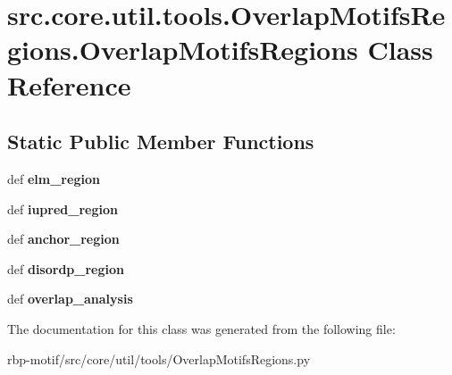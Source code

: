 \hypertarget{classsrc_1_1core_1_1util_1_1tools_1_1OverlapMotifsRegions_1_1OverlapMotifsRegions}{\section{src.\-core.\-util.\-tools.\-Overlap\-Motifs\-Regions.\-Overlap\-Motifs\-Regions Class Reference}
\label{classsrc_1_1core_1_1util_1_1tools_1_1OverlapMotifsRegions_1_1OverlapMotifsRegions}
}
\subsection*{Static Public Member Functions}
\begin{DoxyCompactItemize}
\item 
\hypertarget{classsrc_1_1core_1_1util_1_1tools_1_1OverlapMotifsRegions_1_1OverlapMotifsRegions_a29a40ac0aa4ac1c90a13525207171a10}{def {\bfseries elm\-\_\-region}}\label{classsrc_1_1core_1_1util_1_1tools_1_1OverlapMotifsRegions_1_1OverlapMotifsRegions_a29a40ac0aa4ac1c90a13525207171a10}

\item 
\hypertarget{classsrc_1_1core_1_1util_1_1tools_1_1OverlapMotifsRegions_1_1OverlapMotifsRegions_a5a5715e2bf90c1cc228292f156b013ab}{def {\bfseries iupred\-\_\-region}}\label{classsrc_1_1core_1_1util_1_1tools_1_1OverlapMotifsRegions_1_1OverlapMotifsRegions_a5a5715e2bf90c1cc228292f156b013ab}

\item 
\hypertarget{classsrc_1_1core_1_1util_1_1tools_1_1OverlapMotifsRegions_1_1OverlapMotifsRegions_ab412b93a6177217a3705a24af1a05a8c}{def {\bfseries anchor\-\_\-region}}\label{classsrc_1_1core_1_1util_1_1tools_1_1OverlapMotifsRegions_1_1OverlapMotifsRegions_ab412b93a6177217a3705a24af1a05a8c}

\item 
\hypertarget{classsrc_1_1core_1_1util_1_1tools_1_1OverlapMotifsRegions_1_1OverlapMotifsRegions_a2eb5f872994d4f1e5642c895dbe17b3f}{def {\bfseries disordp\-\_\-region}}\label{classsrc_1_1core_1_1util_1_1tools_1_1OverlapMotifsRegions_1_1OverlapMotifsRegions_a2eb5f872994d4f1e5642c895dbe17b3f}

\item 
\hypertarget{classsrc_1_1core_1_1util_1_1tools_1_1OverlapMotifsRegions_1_1OverlapMotifsRegions_a6d23c4fce17ca8a81eae2f7940678a7f}{def {\bfseries overlap\-\_\-analysis}}\label{classsrc_1_1core_1_1util_1_1tools_1_1OverlapMotifsRegions_1_1OverlapMotifsRegions_a6d23c4fce17ca8a81eae2f7940678a7f}

\end{DoxyCompactItemize}


The documentation for this class was generated from the following file\-:\begin{DoxyCompactItemize}
\item 
rbp-\/motif/src/core/util/tools/Overlap\-Motifs\-Regions.\-py\end{DoxyCompactItemize}
